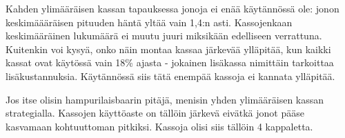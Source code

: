 \documentclass{article}     %
\begin{document}
Kahden ylimääräisen kassan tapauksessa jonoja ei enää käytännössä ole: jonon keskimäääräisen pituuden häntä yltää vain 1,4:n asti. Kassojenkaan keskimääräinen lukumäärä ei muutu juuri miksikään edelliseen verrattuna. Kuitenkin voi kysyä, onko näin montaa kassaa järkevää ylläpitää, kun kaikki kassat ovat käytössä vain 18\% ajasta - jokainen lisäkassa nimittäin tarkoittaa lisäkustannuksia. Käytännössä siis tätä enempää kassoja ei kannata ylläpitää.

Jos itse olisin hampurilaisbaarin pitäjä, menisin yhden ylimääräisen kassan strategialla. Kassojen käyttöaste on tällöin järkevä eivätkä jonot pääse kasvamaan kohtuuttoman pitkiksi. Kassoja olisi siis tällöin 4 kappaletta.
\end{document}
